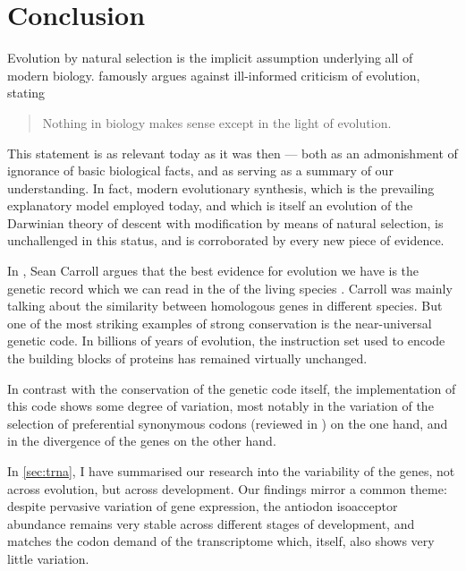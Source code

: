 \chapter{Conclusion}
\label{sec:conclusion}


\noindent
Evolution by natural selection is the implicit assumption underlying all of
modern biology. \citet{Dobzhansky:1973} famously argues against ill-informed
criticism of evolution, stating

\begin{quote}
    Nothing in biology makes sense except in the light of evolution.
\end{quote}

This statement is as relevant today as it was then --- both as an admonishment
of ignorance of basic biological facts, and as serving as a summary of our
understanding. In fact, modern evolutionary synthesis, which is the prevailing
explanatory model employed today, and which is itself an evolution of the
Darwinian theory of descent with modification by means of natural selection, is
unchallenged in this status, and is corroborated by every new piece of evidence.

In , Sean Carroll argues that the best
evidence for evolution we have is the genetic record which we can read in the
\dna of the living species \citep{Carroll:2006}. Carroll was mainly talking
about the similarity between homologous genes in different species. But one of
the most striking examples of strong conservation is the near-universal genetic
code. In billions of years of evolution, the instruction set used to encode the
building blocks of proteins has remained virtually unchanged.

In contrast with the conservation of the genetic code itself, the implementation
of this code shows some degree of variation, most notably in the variation of
the selection of preferential synonymous codons (reviewed in
\citet{Ermolaeva:2001}) on the one hand, and in the divergence of the \trna
genes \citep{Kutter:2011} on the other hand.

In \cref{sec:trna}, I have summarised our research into the variability of the
\trna genes, not across evolution, but across development. Our findings mirror a
common theme: despite pervasive variation of \trna gene expression, the antiodon
isoacceptor \trna abundance remains very stable across different stages of
development, and matches the codon demand of the transcriptome which, itself,
also shows very little variation.

